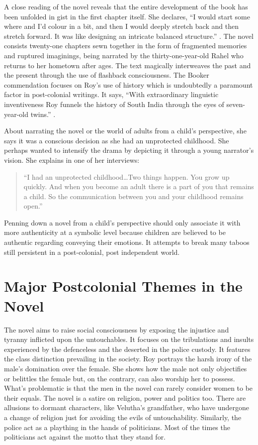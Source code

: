 A close reading of the novel reveals that the entire development of the book has been unfolded in gist in the first chapter itself. She declares, ``I would start some where and I’d colour in a bit, and then I would deeply stretch back and then stretch forward. It was like designing an intricate balanced structure.'' \parencite[34]{TalwarShashi}. The novel consists twenty-one chapters sewn together in the form of fragmented memories and ruptured imaginings, being narrated by the thirty-one-year-old Rahel who returns to her hometown after ages. The text magically interweaves the past and the present through the use of flashback consciousness. The Booker commendation focuses on Roy’s use of history which is undoubtedly a paramount factor in post-colonial writings. It says, ``With extraordinary linguistic inventiveness Roy funnels the history of South India through the eyes of seven-year-old twins.'' \parencite[47]{Abraham}.


About narrating the novel or the world of adults from a child’s perspective, she says it was a conscious decision as she had an unprotected childhood. She perhaps wanted to intensify the drama by depicting it through a young narrator’s vision. She explains in one of her interviews:

\begin{quote}
  “I had an unprotected childhood\ldots Two things happen. You grow up quickly. And when you become an adult there is a part of you that remains a child. So the communication between you and your childhood remains open.” \parencite[47]{Abraham}
\end{quote}

Penning down a novel from a child’s perspective should only associate it with more authenticity at a symbolic level because children are believed to be authentic regarding conveying their emotions. It attempts to break many taboos still persistent in a post-colonial, post independent world.

\section{Major Postcolonial Themes in the Novel}

The novel aims to raise social consciousness by exposing the injustice and tyranny inflicted upon the untouchables. It focuses on the tribulations and insults experienced by the defenceless and the deserted in the police custody. It features the class distinction prevailing in the society. Roy portrays the harsh irony of the male’s domination over the female. She shows how the male not only objectifies or belittles the female but, on the contrary, can also worship her to possess. What’s problematic is that the men in the novel can rarely consider women to be their equals. The novel is a satire on religion, power and politics too. There are allusions to dormant characters, like Velutha’s grandfather, who have undergone a change of religion just for avoiding the evils of untouchability. Similarly, the police act as a plaything in the hands of politicians. Most of the times the politicians act against the motto that they stand for.

